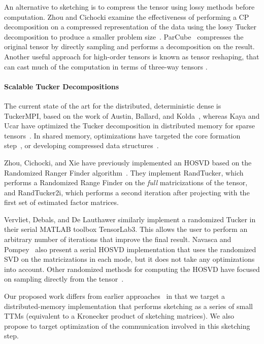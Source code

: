 An alternative to sketching is to compress the tensor using lossy methods before computation. Zhou and Cichocki examine the effectiveness of performing a CP decomposition on a compressed representation of the data using the lossy Tucker decomposition to produce a smaller problem size~\cite{bigtens}. ParCube~\cite{parcube} compresses the original tensor by directly sampling and performs a decomposition on the result.
Another useful approach for high-order tensors is known as tensor reshaping, that can cast much of the computation in terms of three-way tensors \cite{PTC13b}.

\paragraph{Scalable Tucker Decompositions}
The current state of the art for the distributed, deterministic dense \hosvd is TuckerMPI, based on the work of Austin, Ballard, and Kolda~\cite{AuBaKo16}, whereas Kaya and Ucar have optimized the Tucker decomposition in distributed memory for sparse tensors~\cite{kaya1}. In shared memory, optimizations have targeted the core formation step~\cite{intensli}, or developing compressed data structures~\cite{shadentucker}.  

Zhou, Cichocki, and Xie have previously implemented an HOSVD based on the Randomized Ranger Finder algorithm~\cite{bigtens}. They implement RandTucker, which performs a Randomized Range Finder on the \emph{full} matricizations of the tensor, and RandTucker2i, which performs a second iteration after projecting with the first set of estimated factor matrices. 

Vervliet, Debals, and De Lauthawer similarly implement a randomized Tucker in their serial MATLAB toolbox TensorLab3\cite{DBLP:conf/acssc/VervlietDL16}. This allows the user to perform an arbitrary number of iterations that improve the final result. Navasca and Pompey~\cite{Navasca2015} also present a serial HOSVD implementation that uses the randomized SVD on the matricizations in each mode, but it does not take any optimizations into account. Other randomized methods for computing the HOSVD have focused on sampling directly from the tensor~\cite{Tsou10,DM07}.

Our proposed work differs from earlier approaches~\cite{bigtens,DBLP:conf/acssc/VervlietDL16,Navasca2015} in that we target a distributed-memory implementation that performs sketching as a series of small TTMs (equivalent to a Kronecker product of sketching matrices). We also propose to target optimization of the communication involved in this sketching step. 

